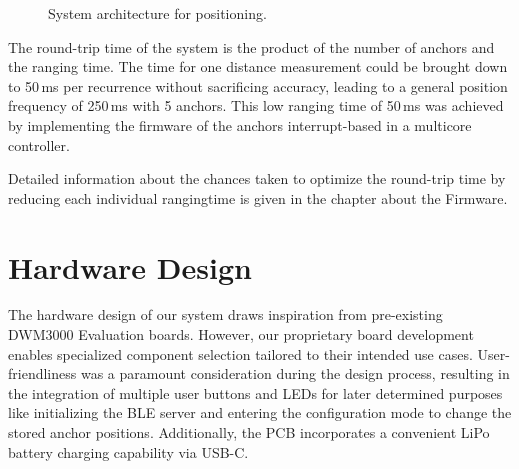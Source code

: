 \documentclass[conference, a4paper]{IEEEtran}
\begin{document}
\begin{figure}[hbt!]
	\centering
	\caption{System architecture for positioning.}
	\label{fig:systemarch}
\end{figure}

The round-trip time of the system is the product of the number of anchors and the ranging time.
The time for one distance measurement could be brought down to 50\,ms per recurrence without sacrificing accuracy, leading to a general position frequency of 250\,ms with 5 anchors. 
This low ranging time of 50\,ms was achieved by implementing the firmware of the anchors interrupt-based in a multicore controller.

Detailed information about the chances taken to optimize the round-trip time by reducing each individual rangingtime
is given in the chapter about the Firmware.


\section{Hardware Design}\label{section:hardware}
The hardware design of our system draws inspiration from pre-existing DWM3000 Evaluation
boards.
However, our proprietary board development enables specialized component selection
tailored to their intended use cases.
User-friendliness was a paramount consideration during the design process,
resulting in the integration of multiple user buttons and LEDs for later determined purposes like initializing the \ac{BLE} server and entering the configuration mode to change the stored anchor positions.
Additionally, the PCB incorporates a convenient LiPo battery charging capability
via USB-C.
\end{document}
